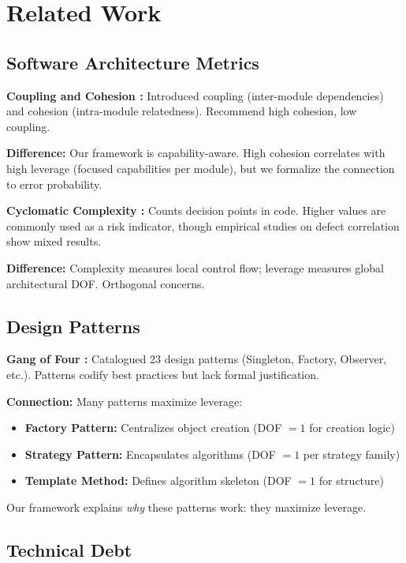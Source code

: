 \section{Related Work}\label{related-work}

\subsection{Software Architecture Metrics}

\textbf{Coupling and Cohesion \cite{stevens1974structured}:} Introduced coupling (inter-module dependencies) and cohesion (intra-module relatedness). Recommend high cohesion, low coupling.

\textbf{Difference:} Our framework is capability-aware. High cohesion correlates with high leverage (focused capabilities per module), but we formalize the connection to error probability.

\textbf{Cyclomatic Complexity \cite{mccabe1976complexity}:} Counts decision points in code. Higher values are commonly used as a risk indicator, though empirical studies on defect correlation show mixed results.

\textbf{Difference:} Complexity measures local control flow; leverage measures global architectural DOF. Orthogonal concerns.

\subsection{Design Patterns}

\textbf{Gang of Four \cite{gamma1994design}:} Catalogued 23 design patterns (Singleton, Factory, Observer, etc.). Patterns codify best practices but lack formal justification.

\textbf{Connection:} Many patterns maximize leverage:
\begin{itemize}
\item \textbf{Factory Pattern:} Centralizes object creation (DOF $= 1$ for creation logic)
\item \textbf{Strategy Pattern:} Encapsulates algorithms (DOF $= 1$ per strategy family)
\item \textbf{Template Method:} Defines algorithm skeleton (DOF $= 1$ for structure)
\end{itemize}

Our framework explains \emph{why} these patterns work: they maximize leverage.

\subsection{Technical Debt}

